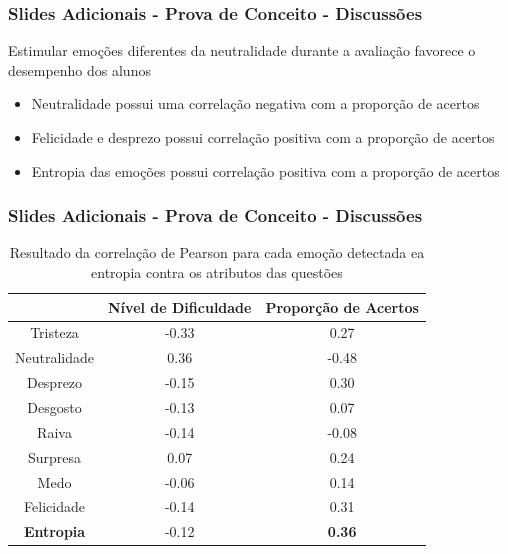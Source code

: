 \begin{frame}
\frametitle{Slides Adicionais - Prova de Conceito - Discussões}
\begin{block}{Estimular emo\c{c}\~oes diferentes da neutralidade durante a avalia\c{c}\~ao favorece o desempenho dos alunos}
\begin{itemize}
\item Neutralidade possui uma correla\c{c}\~ao negativa com a propor\c{c}\~ao de acertos
\item Felicidade e desprezo possui correla\c{c}\~ao positiva com a propor\c{c}\~ao de acertos
\pause
\item Entropia das emo\c{c}\~oes possui correla\c{c}\~ao positiva com a propor\c{c}\~ao de acertos
\end{itemize}
\end{block}

\end{frame}

\begin{frame}
\frametitle{Slides Adicionais - Prova de Conceito - Discussões}
\begin{table}[]\footnotesize
\centering
\caption{Resultado​ ​da​ ​correla\c{c}\~ao​ ​de​ ​Pearson​ ​para​ ​cada​ ​emo\c{c}\~ao​ ​detectada
e​ ​a​ ​entropia​ ​contra​ ​os​ ​atributos​ ​das​ ​quest\~oes}
\label{my-label}
\begin{tabular}{|c|c|c|}
\hline
                      & \textbf{Nível de Dificuldade} & \textbf{Proporção de Acertos} \\ \hline
Tristeza	     & -0.33                & 0.27                          \\ \hline
Neutralidade & 0.36                 & -0.48                \\ \hline
Desprezo     		& -0.15                         & 0.30                 \\ \hline
Desgosto              & -0.13                         & 0.07                          \\ \hline
Raiva                 & -0.14                         & -0.08                         \\ \hline
Surpresa              & 0.07                          & 0.24                          \\ \hline
Medo                  & -0.06                         & 0.14                          \\ \hline
Felicidade   		& -0.14                         & 0.31                 \\ \hline
\small \textbf{Entropia}     		& -0.12                         & \small \textbf{0.36}                 \\ \hline
\end{tabular}
\end{table}
\end{frame}

